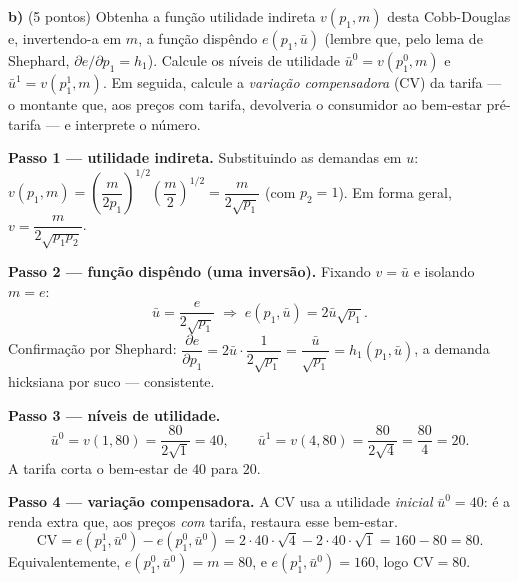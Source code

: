 \textbf{b)} (5 pontos) Obtenha a função utilidade indireta $v(p_1,m)$ desta Cobb-Douglas e, invertendo-a em $m$, a função dispêndo $e(p_1,\bar u)$ (lembre que, pelo lema de Shephard, $\partial e/\partial p_1=h_1$). Calcule os níveis de utilidade $\bar u^{0}=v(p_1^{0},m)$ e $\bar u^{1}=v(p_1^{1},m)$. Em seguida, calcule a \emph{variação compensadora} (CV) da tarifa --- o montante que, aos preços com tarifa, devolveria o consumidor ao bem-estar pré-tarifa --- e interprete o número.
\resolucaobox{7.2cm}
\begin{solucao}
\textbf{Passo 1 --- utilidade indireta.} Substituindo as demandas em $u$: $v(p_1,m)=\left(\dfrac{m}{2p_1}\right)^{1/2}\left(\dfrac{m}{2}\right)^{1/2}=\dfrac{m}{2\sqrt{p_1}}$ (com $p_2=1$). Em forma geral, $v=\dfrac{m}{2\sqrt{p_1p_2}}$.

\textbf{Passo 2 --- função dispêndo (uma inversão).} Fixando $v=\bar u$ e isolando $m=e$:
\[
\bar u=\frac{e}{2\sqrt{p_1}}\;\Rightarrow\; e(p_1,\bar u)=2\bar u\sqrt{p_1}.
\]
Confirmação por Shephard: $\dfrac{\partial e}{\partial p_1}=2\bar u\cdot\dfrac{1}{2\sqrt{p_1}}=\dfrac{\bar u}{\sqrt{p_1}}=h_1(p_1,\bar u)$, a demanda hicksiana por suco --- consistente.

\textbf{Passo 3 --- níveis de utilidade.}
\[
\bar u^{0}=v(1,80)=\frac{80}{2\sqrt{1}}=40,\qquad \bar u^{1}=v(4,80)=\frac{80}{2\sqrt{4}}=\frac{80}{4}=20.
\]
A tarifa corta o bem-estar de $40$ para $20$.

\textbf{Passo 4 --- variação compensadora.} A CV usa a utilidade \emph{inicial} $\bar u^{0}=40$: é a renda extra que, aos preços \emph{com} tarifa, restaura esse bem-estar.
\[
\mathrm{CV}=e(p_1^{1},\bar u^{0})-e(p_1^{0},\bar u^{0})=2\cdot 40\cdot\sqrt{4}-2\cdot 40\cdot\sqrt{1}=160-80=80.
\]
Equivalentemente, $e(p_1^{0},\bar u^{0})=m=80$, e $e(p_1^{1},\bar u^{0})=160$, logo $\mathrm{CV}=80$.


\end{solucao}
